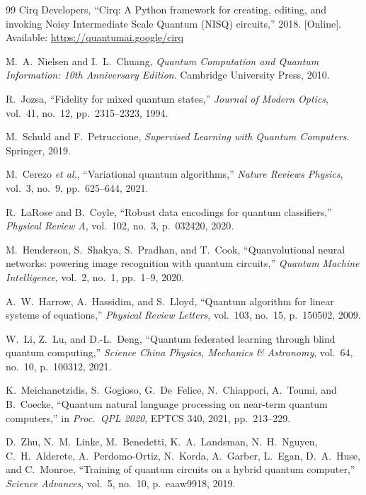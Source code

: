 \documentclass[journal,12pt]{IEEEtran}
\begin{document}
\begin{thebibliography}{99}
Cirq Developers,
``Cirq: A Python framework for creating, editing, and invoking Noisy
Intermediate Scale Quantum (NISQ) circuits,''
2018. [Online]. Available: \url{https://quantumai.google/cirq}

M.~A.~Nielsen and I.~L.~Chuang,
\textit{Quantum Computation and Quantum Information: 10th Anniversary
Edition}. Cambridge University Press, 2010.

R.~Jozsa,
``Fidelity for mixed quantum states,''
\textit{Journal of Modern Optics}, vol.~41, no.~12, pp.~2315--2323, 1994.

M.~Schuld and F.~Petruccione,
\textit{Supervised Learning with Quantum Computers}. Springer, 2019.

M.~Cerezo \textit{et al.},
``Variational quantum algorithms,''
\textit{Nature Reviews Physics}, vol.~3, no.~9, pp.~625--644, 2021.

R.~LaRose and B.~Coyle,
``Robust data encodings for quantum classifiers,''
\textit{Physical Review A}, vol.~102, no.~3, p.~032420, 2020.

M.~Henderson, S.~Shakya, S.~Pradhan, and T.~Cook,
``Quanvolutional neural networks: powering image recognition with quantum
circuits,'' \textit{Quantum Machine Intelligence}, vol.~2, no.~1,
pp.~1--9, 2020.

A.~W.~Harrow, A.~Hassidim, and S.~Lloyd,
``Quantum algorithm for linear systems of equations,''
\textit{Physical Review Letters}, vol.~103, no.~15, p.~150502, 2009.

W.~Li, Z.~Lu, and D.-L.~Deng,
``Quantum federated learning through blind quantum computing,''
\textit{Science China Physics, Mechanics \& Astronomy},
vol.~64, no.~10, p.~100312, 2021.

K.~Meichanetzidis, S.~Gogioso, G.~De~Felice, N.~Chiappori, A.~Toumi,
and B.~Coecke, ``Quantum natural language processing on near-term
quantum computers,'' in \textit{Proc.\ QPL 2020}, EPTCS 340, 2021,
pp.~213--229.

D.~Zhu, N.~M.~Linke, M.~Benedetti, K.~A.~Landsman, N.~H.~Nguyen,
C.~H.~Alderete, A.~Perdomo-Ortiz, N.~Korda, A.~Garber, L.~Egan,
D.~A.~Huse, and C.~Monroe,
``Training of quantum circuits on a hybrid quantum computer,''
\textit{Science Advances}, vol.~5, no.~10, p.~eaaw9918, 2019.


\end{thebibliography}
\end{document}
